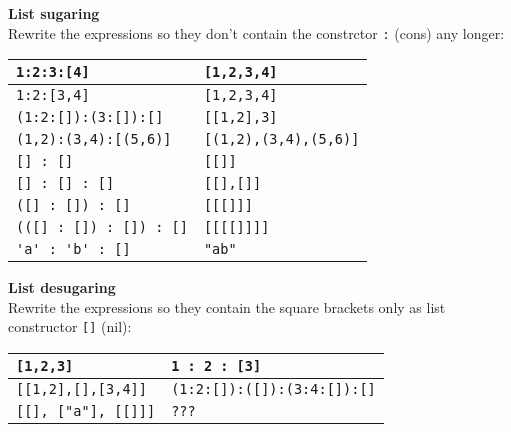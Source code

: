 \textbf{List sugaring}\\
Rewrite the expressions so they don't contain the constrctor \lstinline|:| (cons) any longer:\\
\begin{tabularx}{\linewidth}{|X|X|}
  \hline
  \lstinline|1:2:3:[4]| & \lstinline|[1,2,3,4]|\\
  \hline
  \lstinline|1:2:[3,4]| & \lstinline|[1,2,3,4]|\\
  \hline
  \lstinline|(1:2:[]):(3:[]):[]| & \lstinline|[[1,2],3]|\\
  \hline
  \lstinline|(1,2):(3,4):[(5,6)]| & \lstinline|[(1,2),(3,4),(5,6)]|\\
  \hline
  \lstinline|[] : []| & \lstinline|[[]]|\\
  \hline
  \lstinline|[] : [] : []| & \lstinline|[[],[]]|\\
  \hline
  \lstinline|([] : []) : []| & \lstinline|[[[]]]|\\
  \hline
  \lstinline|(([] : []) : []) : []| & \lstinline|[[[[]]]]|\\
  \hline
  \lstinline|'a' : 'b' : []| & \lstinline|"ab"|\\
  \hline
\end{tabularx}

\textbf{List desugaring}\\
Rewrite the expressions so they contain the square brackets only as list constructor \lstinline|[]| (nil):\\
\begin{tabularx}{\linewidth}{|X|X|}
  \hline
  \lstinline|[1,2,3]| & \lstinline|1 : 2 : [3]|\\
  \hline
  \lstinline|[[1,2],[],[3,4]]| & \lstinline|(1:2:[]):([]):(3:4:[]):[]|\\
  \hline
  \lstinline|[[], ["a"], [[]]]| & \lstinline|???|\\ %
  \hline
\end{tabularx}


